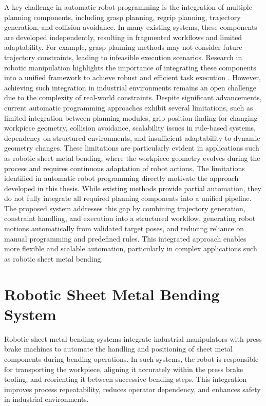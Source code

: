 A key challenge in automatic robot programming is the integration of multiple planning components, including grasp planning, regrip planning, trajectory generation, and collision avoidance.
In many existing systems, these components are developed independently, resulting in fragmented workflows and limited adaptability. For example, grasp planning methods may not consider future trajectory constraints, leading to infeasible execution scenarios.
Research in robotic manipulation highlights the importance of integrating these components into a unified framework to achieve robust and efficient task execution \cite{bohg2014data}. However, achieving such integration in industrial environments remains an open challenge due to the complexity of real-world constraints.
Despite significant advancements, current automatic programming approaches exhibit several limitations, such as limited integration between planning modules, grip position finding for changing workpiece geometry, collision avoidance, scalability issues in rule-based systems, dependency on structured environments, and insufficient adaptability to dynamic geometry changes.
These limitations are particularly evident in applications such as robotic sheet metal bending, where the workpiece geometry evolves during the process and requires continuous adaptation of robot actions. 
The limitations identified in automatic robot programming directly motivate the approach developed in this thesis. While existing methods provide partial automation, they do not fully integrate all required planning components into a unified pipeline.
The proposed system addresses this gap by combining trajectory generation, constraint handling, and execution into a structured workflow, generating robot motions automatically from validated target poses, and reducing reliance on manual programming and predefined rules.
This integrated approach enables more flexible and scalable automation, particularly in complex applications such as robotic sheet metal bending.
 
\section{Robotic Sheet Metal Bending System}
\label{sec:robotic-sheet-metal-bending-system}
Robotic sheet metal bending systems integrate industrial manipulators with press brake machines to automate the handling and positioning of sheet metal components during bending operations. In such systems, the robot is responsible for transporting the workpiece, aligning it accurately within the press brake tooling, and reorienting it between successive bending steps. This integration improves process repeatability, reduces operator dependency, and enhances safety in industrial environments.
 
